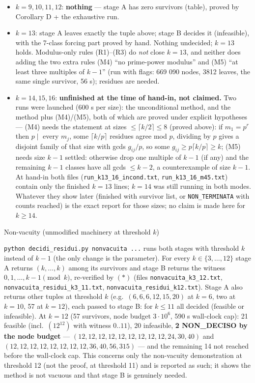 \begin{itemize}
\tightlist
\item
  \(k=9,10,11,12\): \textbf{nothing} --- stage A has zero survivors
  (table), proved by Corollary D + the exhaustive run.
\item
  \(k=13\): stage A leaves exactly the tuple above; stage B decides it
  (infeasible), with the 7-class forcing part proved by hand. Nothing
  undecided; \(k=13\) holds. Modulus-only rules (R1)--(R3) do \emph{not}
  close \(k=13\), and neither does adding the two extra rules (M4) ``no
  prime-power modulus'' and (M5) ``at least three multiples of \(k-1\)''
  (run with flags: 669 090 nodes, 3812 leaves, the same single survivor,
  56 s); residues are needed.
\item
  \(k=14,15,16\): \textbf{unfinished at the time of hand-in, not
  claimed.} Two runs were launched (600 s per size): the unconditional
  method, and the method plus (M4)/(M5), both of which are proved under
  explicit hypotheses --- (M4) needs the statement at sizes
  \(\le\lceil k/2\rceil\le8\) (proved above): if \(m_1=p^r\) then
  \(p\mid\) every \(m_j\), some \(\lceil k/p\rceil\) residues agree mod
  \(p\), dividing by \(p\) gives a disjoint family of that size with
  gcds \(g_{ij}/p\), so some \(g_{ij}\ge p\lceil k/p\rceil\ge k\); (M5)
  needs size \(k-1\) settled: otherwise drop one multiple of \(k-1\) (if
  any) and the remaining \(k-1\) classes have all gcds \(\le k-2\), a
  counterexample of size \(k-1\). At hand-in both files
  (\texttt{run\_k13\_16\_incond.txt}, \texttt{run\_k13\_16\_m45.txt})
  contain only the finished \(k=13\) lines; \(k=14\) was still running
  in both modes. Whatever they show later (finished with survivor list,
  or \texttt{NON\_TERMINATA} with counts reached) is the exact report
  for those sizes; no claim is made here for \(k\ge14\).
\end{itemize}

Non-vacuity (unmodified machinery at threshold \(k\))

\texttt{python\ decidi\_residui.py\ nonvacuita\ ...} runs both stages
with threshold \(k\) instead of \(k-1\) (the only change is the
parameter). For every \(k\in\{3,\dots,12\}\) stage A returns
\((k,\dots,k)\) among its survivors and stage B returns the witness
\(0,1,\dots,k-1\pmod k\), re-verified by \((*)\) (files
\texttt{nonvacuita\_k3\_12.txt},
\texttt{nonvacuita\_residui\_k3\_11.txt},
\texttt{nonvacuita\_residui\_k12.txt}). Stage A also returns other
tuples at threshold \(k\) (e.g.~\((6,6,6,12,15,20)\) at \(k=6\), two at
\(k=10\), 57 at \(k=12\)), each passed to stage B: for \(k\le11\) all
decided (feasible or infeasible). At \(k=12\) (57 survivors, node budget
\(3\cdot10^6\), 590 s wall-clock cap): 21 feasible (incl.~\((12^{12})\)
with witness \(0..11\)), 20 infeasible, \textbf{2 NON\_DECISO by the
node budget} --- \((12,12,12,12,12,12,12,12,12,24,30,40)\) and
\((12,12,12,12,12,12,12,12,36,40,56,315)\) --- and the remaining 14 not
reached before the wall-clock cap. This concerns only the non-vacuity
demonstration at threshold 12 (not the proof, at threshold 11) and is
reported as such; it shows the method is not vacuous and that stage B is
genuinely needed.

